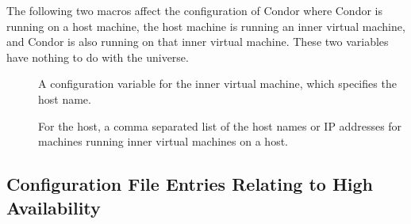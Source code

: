 \begin{description}



\end{description}

The following two macros affect the configuration of Condor where Condor is
running on a host machine, the host machine is running an
inner virtual machine,
and Condor is also running on that inner virtual machine.
These two variables have nothing to do with the 
universe.

\begin{description}
\item[]
\label{param:VMPHostMachine}
A configuration variable for the inner virtual machine,
which specifies the host name.

\item[]
\label{param:VMPVMList}
For the host, 
a comma separated list of the host names or IP addresses
for machines running inner virtual machines on a host.
\end{description}

\subsection{\label{sec:HA-Config-File-Entries}Configuration File Entries
Relating to High Availability}

